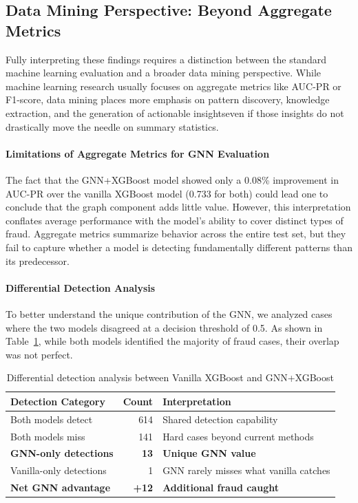 \subsection{Data Mining Perspective: Beyond Aggregate Metrics}
\label{sec:5_10_1a}

Fully interpreting these findings requires a distinction between the standard machine learning evaluation and a broader data mining perspective. While machine learning research usually focuses on aggregate metrics like AUC-PR or F1-score, data mining places more emphasis on pattern discovery, knowledge extraction, and the generation of actionable insightseven if those insights do not drastically move the needle on summary statistics.

\paragraph{Limitations of Aggregate Metrics for GNN Evaluation}

The fact that the GNN+XGBoost model showed only a 0.08\% improvement in AUC-PR over the vanilla XGBoost model (0.733 for both) could lead one to conclude that the graph component adds little value. However, this interpretation conflates average performance with the model's ability to cover distinct types of fraud. Aggregate metrics summarize behavior across the entire test set, but they fail to capture whether a model is detecting fundamentally different patterns than its predecessor.

\paragraph{Differential Detection Analysis}

To better understand the unique contribution of the GNN, we analyzed cases where the two models disagreed at a decision threshold of 0.5. As shown in Table~\ref{tab:5_10_differential}, while both models identified the majority of fraud cases, their overlap was not perfect.

\begin{table}[h]
\centering
\caption{Differential detection analysis between Vanilla XGBoost and GNN+XGBoost}
\label{tab:5_10_differential}
\begin{tabular}{lrl}
\toprule
\textbf{Detection Category} & \textbf{Count} & \textbf{Interpretation} \\
\midrule
Both models detect & 614 & Shared detection capability \\
Both models miss & 141 & Hard cases beyond current methods \\
\textbf{GNN-only detections} & \textbf{13} & \textbf{Unique GNN value} \\
Vanilla-only detections & 1 & GNN rarely misses what vanilla catches \\
\midrule
\textbf{Net GNN advantage} & \textbf{+12} & \textbf{Additional fraud caught} \\
\bottomrule
\end{tabular}
\end{table}

